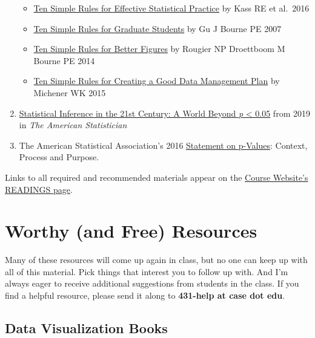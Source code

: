 \documentclass[
]{book}
\providecommand{\tightlist}{%
  \setlength{\itemsep}{0pt}\setlength{\parskip}{0pt}}
\begin{document}
\begin{enumerate}
  \begin{itemize}
  \tightlist
  \item
    \href{http://journals.plos.org/ploscompbiol/article?id=10.1371\%2Fjournal.pcbi.1004961}{Ten Simple Rules for Effective Statistical Practice} by Kass RE et al.~2016
  \item
    \href{http://journals.plos.org/ploscompbiol/article?id=10.1371/journal.pcbi.0030229}{Ten Simple Rules for Graduate Students} by Gu J Bourne PE 2007
  \item
    \href{http://journals.plos.org/ploscompbiol/article?id=10.1371/journal.pcbi.1003833}{Ten Simple Rules for Better Figures} by Rougier NP Droettboom M Bourne PE 2014
  \item
    \href{http://journals.plos.org/ploscompbiol/article?id=10.1371/journal.pcbi.1004525}{Ten Simple Rules for Creating a Good Data Management Plan} by Michener WK 2015
  \end{itemize}
\item
  \href{https://amstat.tandfonline.com/toc/utas20/73/sup1}{Statistical Inference in the 21st Century: A World Beyond \emph{p} \textless{} 0.05} from 2019 in \emph{The American Statistician}
\item
  The American Statistical Association's 2016 \href{http://amstat.tandfonline.com/doi/full/10.1080/00031305.2016.1154108}{Statement on p-Values}: Context, Process and Purpose.
\end{enumerate}

Links to all required and recommended materials appear on the \href{https://github.com/THOMASELOVE/2019-431/tree/master/READINGS}{Course Website's READINGS page}.

\hypertarget{worthy-and-free-resources}{%
\chapter{Worthy (and Free) Resources}\label{worthy-and-free-resources}}

Many of these resources will come up again in class, but no one can keep up with all of this material. Pick things that interest you to follow up with. And I'm always eager to receive additional suggestions from students in the class. If you find a helpful resource, please send it along to \textbf{431-help at case dot edu}.

\hypertarget{data-visualization-books}{%
\section{Data Visualization Books}\label{data-visualization-books}}
\end{document}
